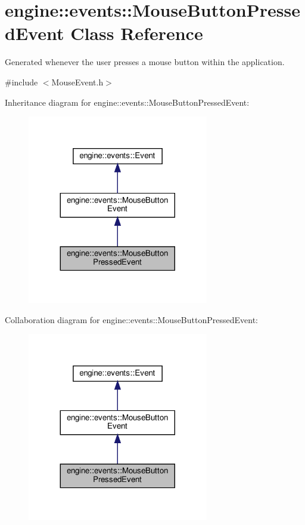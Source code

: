 \hypertarget{classengine_1_1events_1_1MouseButtonPressedEvent}{}\section{engine\+:\+:events\+:\+:Mouse\+Button\+Pressed\+Event Class Reference}
\label{classengine_1_1events_1_1MouseButtonPressedEvent}


Generated whenever the user presses a mouse button within the application.  




{\ttfamily \#include $<$Mouse\+Event.\+h$>$}



Inheritance diagram for engine\+:\+:events\+:\+:Mouse\+Button\+Pressed\+Event\+:
\nopagebreak
\begin{figure}[H]
\begin{center}
\leavevmode
\includegraphics[width=224pt]{classengine_1_1events_1_1MouseButtonPressedEvent__inherit__graph}
\end{center}
\end{figure}


Collaboration diagram for engine\+:\+:events\+:\+:Mouse\+Button\+Pressed\+Event\+:
\nopagebreak
\begin{figure}[H]
\begin{center}
\leavevmode
\includegraphics[width=224pt]{classengine_1_1events_1_1MouseButtonPressedEvent__coll__graph}
\end{center}
\end{figure}
